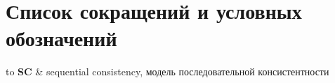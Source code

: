\chapter*{Список сокращений и условных обозначений}             %
\noindent
\addtocounter{table}{-1}%
\begin{longtabu} to \textwidth {r X}
{\bf SC} & sequential consistency, модель последовательной консистентности



\end{longtabu}

